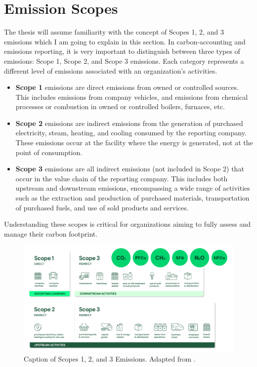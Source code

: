 \section{Emission Scopes}
The thesis will assume familiarity with the concept of Scopes 1, 2, and 3 emissions which I am going to explain in this section. In carbon-accounting and emissions reporting, it is very important to distinguish between three types of emissions: Scope 1, Scope 2, and Scope 3 emissions. Each category represents a different level of emissions associated with an organization's activities. 

\begin{itemize}
    \item \textbf{Scope 1} emissions are direct emissions from owned or controlled sources. This includes emissions from company vehicles, and emissions from chemical processes or combustion in owned or controlled boilers, furnaces, etc.
    \item \textbf{Scope 2} emissions are indirect emissions from the generation of purchased electricity, steam, heating, and cooling consumed by the reporting company. These emissions occur at the facility where the energy is generated, not at the point of consumption.
    \item \textbf{Scope 3} emissions are all indirect emissions (not included in Scope 2) that occur in the value chain of the reporting company. This includes both upstream and downstream emissions, encompassing a wide range of activities such as the extraction and production of purchased materials, transportation of purchased fuels, and use of sold products and services.
\end{itemize}

\noindent Understanding these scopes is critical for organizations aiming to fully assess and manage their carbon footprint.

\begin{figure}[h]
    \centering
    \includegraphics[width=1\textwidth]{figures/emission_scopes.png}
    \caption{Caption of Scopes 1, 2, and 3 Emissions. Adapted from \cite{Bernoville2022Scopes}.}
    \label{fig:emission_scopes}
\end{figure}


